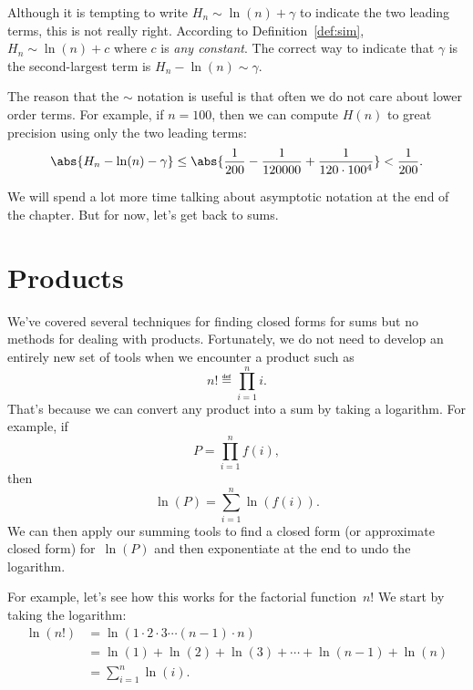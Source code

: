 Although it is tempting to write $H_n \sim \ln(n) + \gamma$ to indicate
the two leading terms, this is not really right.  According to
Definition~\ref{def:sim}, $H_n \sim \ln(n) + c$ where $c$ is \emph{any
  constant}.  The correct way to indicate that $\gamma$ is the
second-largest term is $H_n - \ln(n) \sim \gamma$.

The reason that the $\sim$ notation is useful is that often we do not care
about lower order terms.  For example, if $n = 100$, then we can compute
$H(n)$ to great precision using only the two leading terms:
\[
\abs{H_n - \ln(n) - \gamma} \leq \abs{\frac{1}{200} - \frac{1}{120000} +
\frac{1}{120 \cdot 100^4}} < \frac{1}{200}.
\]

We will spend a lot more time talking about asymptotic notation at the
end of the chapter.  But for now, let's get back to sums.

\begin{problems}
\classproblems
{}

\homeworkproblems
{}

\end{problems}



\section{Products}\label{sec:closed_products}

We've covered several techniques for finding closed forms for sums but
no methods for dealing with products.  Fortunately, we do not need to
develop an entirely new set of tools when we encounter a product such
as
\begin{equation}\label{eqn:9P1}
    n! \eqdef \prod_{i = 1}^n i.
\end{equation}
That's because we can convert any product into a sum by taking a
logarithm.  For example, if
\[
    P = \prod_{i  = 1}^n f(i),
\]
then
\[
    \ln(P) = \sum_{i = 1}^n \ln(f(i)).
\]
We can then apply our summing tools to find a closed form (or
approximate closed form) for~$\ln(P)$ and then exponentiate at the end
to undo the logarithm.

For example, let's see how this works for the factorial
function~$n!$  We start by taking the logarithm:
\begin{align*}
\ln (n!)
       & =  \ln(1 \cdot 2 \cdot 3 \cdots (n-1) \cdot n) \\
       & =  \ln(1) + \ln(2) + \ln(3) + \cdots + \ln(n-1) + \ln(n) \\
       & =  \sum_{i=1}^n \ln(i).
\end{align*}

